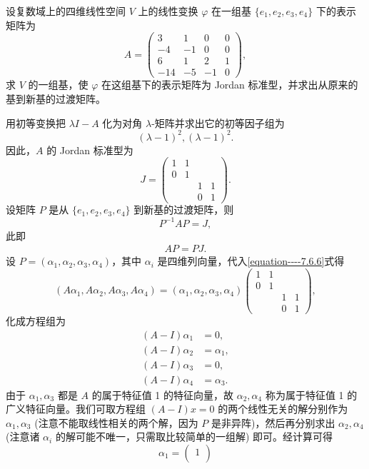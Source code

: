 \documentclass[../../main.tex]{subfiles}%
\begin{document}
\begin{example}
设复数域上的四维线性空间 $V$ 上的线性变换 $\varphi$ 在一组基 $\{e_1,e_2,e_3,e_4\}$ 下的表示矩阵为
\[
A = \begin{pmatrix}
3 & 1 & 0 & 0 \\
-4 & -1 & 0 & 0 \\
6 & 1 & 2 & 1 \\
-14 & -5 & -1 & 0
\end{pmatrix},
\]
求 $V$ 的一组基，使 $\varphi$ 在这组基下的表示矩阵为 Jordan 标准型，并求出从原来的基到新基的过渡矩阵。
\end{example}
\begin{solution}
用初等变换把 $\lambda I - A$ 化为对角 $\lambda$-矩阵并求出它的初等因子组为
\[
(\lambda - 1)^2, (\lambda - 1)^2.
\]
因此，$A$ 的 Jordan 标准型为
\[
J = \begin{pmatrix}
1 & 1 & & \\
0 & 1 & & \\
& & 1 & 1 \\
& & 0 & 1
\end{pmatrix}.
\]
设矩阵 $P$ 是从 $\{e_1,e_2,e_3,e_4\}$ 到新基的过渡矩阵，则
\[
P^{-1}AP = J,
\]
此即
\begin{align}
AP = PJ.\label{equation----7.6.6}
\end{align}
设 $P = (\alpha_1,\alpha_2,\alpha_3,\alpha_4)$，其中 $\alpha_i$ 是四维列向量，代入\eqref{equation----7.6.6}式得
\[
(A\alpha_1,A\alpha_2,A\alpha_3,A\alpha_4) = (\alpha_1,\alpha_2,\alpha_3,\alpha_4)\begin{pmatrix}
1 & 1 & & \\
0 & 1 & & \\
& & 1 & 1 \\
& & 0 & 1
\end{pmatrix},
\]
化成方程组为
\begin{align*}
(A - I)\alpha_1 &= 0,\\
(A - I)\alpha_2 &= \alpha_1,\\
(A - I)\alpha_3 &= 0,\\
(A - I)\alpha_4 &= \alpha_3.
\end{align*}
由于 $\alpha_1,\alpha_3$ 都是 $A$ 的属于特征值 1 的特征向量，故 $\alpha_2,\alpha_4$ 称为属于特征值 1 的广义特征向量。我们可取方程组 $(A - I)x = 0$ 的两个线性无关的解分别作为 $\alpha_1,\alpha_3$ (注意不能取线性相关的两个解，因为 $P$ 是非异阵)，然后再分别求出 $\alpha_2,\alpha_4$ (注意诸 $\alpha_i$ 的解可能不唯一，只需取比较简单的一组解) 即可。经计算可得
\[
\alpha_1 = \begin{pmatrix}
1 \\

\end{pmatrix}\]
\end{solution}
\end{document}
